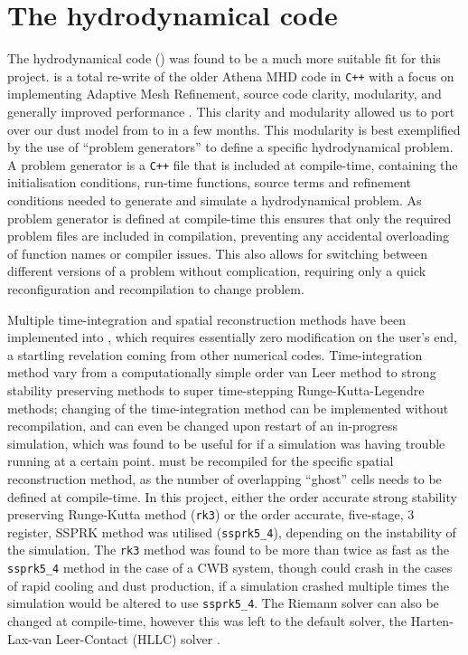 \section{The \athena{} hydrodynamical code}
\label{sec:athenapp}

The \athena{} hydrodynamical code () was found to be a much more suitable fit for this project.
\athena{} is a total re-write of the older Athena MHD code in \texttt{C++} with a focus on implementing Adaptive Mesh Refinement, source code clarity, modularity, and generally improved performance \parencite{stoneAthenaAdaptiveMesh2020}. 
This clarity and modularity allowed us to port over our dust model from \mg{} to \athena{} in a few months.
This modularity is best exemplified by the use of ``problem generators'' to define a specific hydrodynamical problem.
A problem generator is a \texttt{C++} file that is included at compile-time, containing the initialisation conditions, run-time functions, source terms and refinement conditions needed to generate and simulate a hydrodynamical problem.
As problem generator is defined at compile-time this ensures that only the required problem files are included in compilation, preventing any accidental overloading of function names or compiler issues.
This also allows for switching between different versions of a problem without complication, requiring only a quick reconfiguration and recompilation to change problem. 

Multiple time-integration and spatial reconstruction methods have been implemented into \athena{}, which requires essentially zero modification on the user's end, a startling revelation coming from other numerical codes.
Time-integration method vary from a computationally simple  order van Leer \parencite{vanleerUltimateConservativeDifference1979} method to strong stability preserving methods \parencite{ruuthHighOrderStrongStabilityPreservingRungeKutta2005} to super time-stepping Runge-Kutta-Legendre \parencite{meyerStabilizedRungeKuttaLegendreMethod2014} methods;
changing of the time-integration method can be implemented without recompilation, and can even be changed upon restart of an in-progress simulation, which was found to be useful for if a simulation was having trouble running at a certain point.
\athena{} must be recompiled for the specific spatial reconstruction method, as the number of overlapping ``ghost'' cells needs to be defined at compile-time. 
In this project, either the  order accurate strong stability preserving Runge-Kutta method (\texttt{rk3}) or the  order accurate, five-stage, 3 register, SSPRK method was utilised (\texttt{ssprk5\_4}), depending on the instability of the simulation.
The \texttt{rk3} method was found to be more than twice as fast as the \texttt{ssprk5\_4} method in the case of a CWB system, though could crash in the cases of rapid cooling and dust production, if a simulation crashed multiple times the simulation would be altered to use \texttt{ssprk5\_4}. 
The Riemann solver can also be changed at compile-time, however this was left to the default solver, the Harten-Lax-van Leer-Contact (HLLC) solver \parencite{toroRestorationContactSurface1994}.

